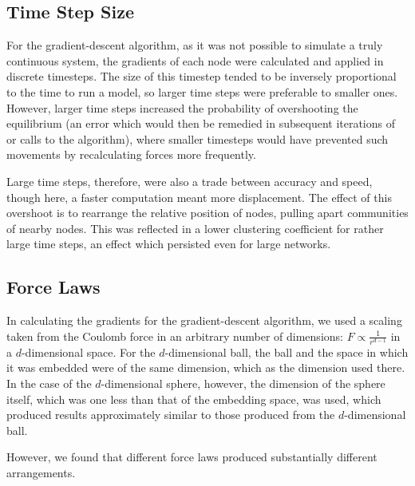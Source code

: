 \documentclass[aps,pre,reprint,superscriptaddress,amsmath,amssymb,nofootinbib]{revtex4-1}
\begin{document}
\subsection{Time Step Size}
For the gradient-descent algorithm, as it was not possible to simulate a truly continuous system, the gradients of each node were calculated and applied in discrete timesteps.  
The size of this timestep tended to be inversely proportional to the time to run a model, so larger time steps were preferable to smaller ones.  
However, larger time steps increased the probability of overshooting the equilibrium (an error which would then be remedied in subsequent iterations of or calls to the algorithm), where smaller timesteps would have prevented such movements by recalculating forces more frequently.

Large time steps, therefore, were also a trade between accuracy and speed, though here, a faster computation meant more displacement.  
The effect of this overshoot is to rearrange the relative position of nodes, pulling apart communities of nearby nodes.
This was reflected in a lower clustering coefficient for rather large time steps, an effect which persisted even for large networks.

\subsection{Force Laws} %
In calculating the gradients for the gradient-descent algorithm, we used a scaling taken from the Coulomb force in an arbitrary number of dimensions: $F \propto \frac{1}{r^{d-1}}$ in a $d$-dimensional space.  
For the $d$-dimensional ball, the ball and the space in which it was embedded were of the same dimension, which as the dimension used there.  
In the case of the $d$-dimensional sphere, however, the dimension of the sphere itself, which was one less than that of the embedding space, was used, which produced results approximately similar to those produced from the $d$-dimensional ball.

However, we found that different force laws produced substantially different arrangements.  %
\end{document}
